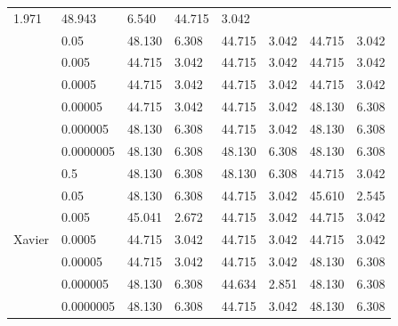 \begin{table}[H]
\begin{tabular}{cl|llllll|}
    \multicolumn{1}{l|}{1.971} &
    48.943 &
    \multicolumn{1}{l|}{6.540} &
    44.715 &
    3.042 \\
\multicolumn{1}{|c|}{} &
    0.05 &
    48.130 &
    \multicolumn{1}{l|}{6.308} &
    44.715 &
    \multicolumn{1}{l|}{3.042} &
    44.715 &
    3.042 \\
\multicolumn{1}{|c|}{} &
    0.005 &
    44.715 &
    \multicolumn{1}{l|}{3.042} &
    44.715 &
    \multicolumn{1}{l|}{3.042} &
    44.715 &
    3.042 \\
\multicolumn{1}{|c|}{} &
    0.0005 &
    44.715 &
    \multicolumn{1}{l|}{3.042} &
    44.715 &
    \multicolumn{1}{l|}{3.042} &
    44.715 &
    3.042 \\
\multicolumn{1}{|c|}{} &
    0.00005 &
    44.715 &
    \multicolumn{1}{l|}{3.042} &
    44.715 &
    \multicolumn{1}{r|}{3.042} &
    48.130 &
    6.308 \\
\multicolumn{1}{|c|}{} &
    0.000005 &
    48.130 &
    \multicolumn{1}{l|}{6.308} &
    44.715 &
    \multicolumn{1}{r|}{3.042} &
    48.130 &
    6.308 \\
\multicolumn{1}{|c|}{} &
    0.0000005 &
    48.130 &
    \multicolumn{1}{l|}{6.308} &
    48.130 &
    \multicolumn{1}{r|}{6.308} &
    48.130 &
    6.308 \\ \hline
\multicolumn{1}{|c|}{\multirow{7}{*}{Xavier}} &
    0.5 &
    48.130 &
    \multicolumn{1}{l|}{6.308} &
    48.130 &
    \multicolumn{1}{l|}{6.308} &
    44.715 &
    \multicolumn{1}{r|}{3.042} \\
\multicolumn{1}{|c|}{} &
    0.05 &
    48.130 &
    \multicolumn{1}{l|}{6.308} &
    44.715 &
    \multicolumn{1}{l|}{3.042} &
    45.610 &
    2.545 \\
\multicolumn{1}{|c|}{} &
    0.005 &
    45.041 &
    \multicolumn{1}{l|}{2.672} &
    44.715 &
    \multicolumn{1}{l|}{3.042} &
    44.715 &
    3.042 \\
\multicolumn{1}{|c|}{} &
    0.0005 &
    44.715 &
    \multicolumn{1}{l|}{3.042} &
    44.715 &
    \multicolumn{1}{r|}{3.042} &
    44.715 &
    3.042 \\
\multicolumn{1}{|c|}{} &
    0.00005 &
    44.715 &
    \multicolumn{1}{l|}{3.042} &
    44.715 &
    \multicolumn{1}{r|}{3.042} &
    48.130 &
    6.308 \\
\multicolumn{1}{|c|}{} &
    0.000005 &
    48.130 &
    \multicolumn{1}{l|}{6.308} &
    44.634 &
    \multicolumn{1}{l|}{2.851} &
    48.130 &
    6.308 \\
\multicolumn{1}{|c|}{} &
    0.0000005 &
    48.130 &
    \multicolumn{1}{l|}{6.308} &
    44.715 &
    \multicolumn{1}{l|}{3.042} &
    48.130 &
    6.308 \\ \hline
\end{tabular}
\label{table:lenetconhard}
\end{table}


